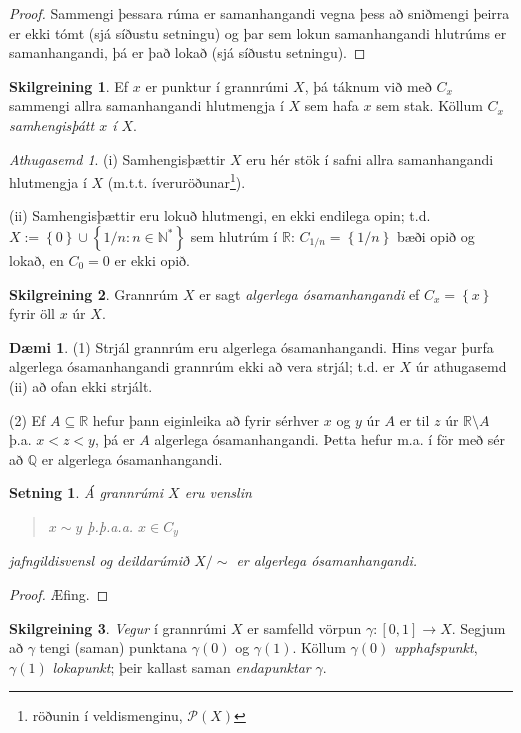 \documentclass[a4paper,icelandic]{book}
\theoremstyle{definition}
\newtheorem{skilgr}{Skilgreining}[section]
\newtheorem{daemi}{Dæmi}[section]
\theoremstyle{plain}
\newtheorem{setn}{Setning}[section]
\theoremstyle{remark}
\newtheorem*{ath}{Athugasemd}
\newcommand{\R}{\mathbb{R}} %
\newcommand{\N}{\mathbb{N}} %
\newcommand{\Q}{\mathbb{Q}} %
\begin{document}
\begin{proof}
  Sammengi þessara rúma er samanhangandi vegna þess að sniðmengi þeirra er ekki
  tómt (sjá síðustu setningu) og þar sem lokun samanhangandi hlutrúms er
  samanhangandi, þá er það lokað (sjá síðustu setningu).
\end{proof}
\begin{skilgr}
  Ef $x$ er punktur í grannrúmi $X$, þá táknum við með $C_x$ sammengi allra
  samanhangandi hlutmengja í $X$ sem hafa $x$ sem stak. Köllum $C_x$
  \emph{samhengisþátt $x$ í $X$}.
\end{skilgr}
\begin{ath}
  (i) Samhengisþættir $X$ eru hér stök í safni allra samanhangandi hlutmengja í
  $X$ (m.t.t. íveruröðunar\footnote{röðunin í veldismenginu, $\mathcal P(X)$}).

  (ii) Samhengisþættir eru lokuð hlutmengi, en ekki endilega opin; t.d.
  $X:=\left\{ 0 \right\}\cup\left\{ 1/n:n\in\N^*\right\}$ sem hlutrúm í $\R$:
  $C_{1/n} = \left\{ 1/n \right\}$ bæði opið og lokað, en $C_0 = 0$ er ekki
  opið.
\end{ath}
\begin{skilgr}
  Grannrúm $X$ er sagt \emph{algerlega ósamanhangandi} ef $C_x = \left\{ x \right\}$ fyrir öll $x$ úr $X$. 
\end{skilgr}
\begin{daemi}
  (1) Strjál grannrúm eru algerlega ósamanhangandi. Hins vegar þurfa algerlega
  ósamanhangandi grannrúm ekki að vera strjál; t.d. er $X$ úr athugasemd (ii) að
  ofan ekki strjált. 

  (2) Ef $A\subseteq \R$ hefur þann eiginleika að fyrir sérhver $x$ og $y$ úr
  $A$ er til $z$ úr $\R\setminus A$ þ.a. $x<z<y$, þá er $A$ algerlega
  ósamanhangandi. Þetta hefur m.a. í för með sér að $\Q$ er algerlega
  ósamanhangandi.
\end{daemi}
\begin{setn}
  Á grannrúmi $X$ eru venslin 
  \begin{quote}
    $x\sim y$ þ.þ.a.a. $x\in C_y$
  \end{quote}
  jafngildisvensl og deildarúmið $X/\sim$ er algerlega ósamanhangandi.
\end{setn}
\begin{proof}
  Æfing.
\end{proof}
\begin{skilgr}
  \emph{Vegur} í grannrúmi $X$ er samfelld vörpun $\gamma:\left[
  0,1 \right]\to X$. Segjum að $\gamma$ tengi (saman) punktana $\gamma(0)$ og
  $\gamma(1)$. Köllum $\gamma(0)$ \emph{upphafspunkt}, $\gamma(1)$
  \emph{lokapunkt}; þeir kallast saman \emph{endapunktar} $\gamma$.
\end{skilgr}
\end{document}
